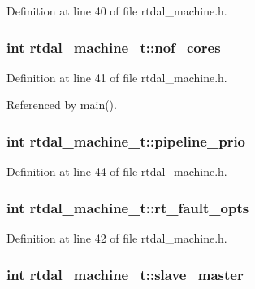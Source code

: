Definition at line 40 of file rtdal\-\_\-machine.\-h.

\hypertarget{structrtdal__machine__t_aac3563adebb6d638b13bc8ec653ee745}{
\subsubsection[{nof\-\_\-cores}]{\setlength{\rightskip}{0pt plus 5cm}int rtdal\-\_\-machine\-\_\-t\-::nof\-\_\-cores}}\label{structrtdal__machine__t_aac3563adebb6d638b13bc8ec653ee745}


Definition at line 41 of file rtdal\-\_\-machine.\-h.



Referenced by main().

\hypertarget{structrtdal__machine__t_a8e553a91b8b34808eb8f20332fdc1189}{
\subsubsection[{pipeline\-\_\-prio}]{\setlength{\rightskip}{0pt plus 5cm}int rtdal\-\_\-machine\-\_\-t\-::pipeline\-\_\-prio}}\label{structrtdal__machine__t_a8e553a91b8b34808eb8f20332fdc1189}


Definition at line 44 of file rtdal\-\_\-machine.\-h.

\hypertarget{structrtdal__machine__t_a9b0cff836cea88c3b44359d928412737}{
\subsubsection[{rt\-\_\-fault\-\_\-opts}]{\setlength{\rightskip}{0pt plus 5cm}int rtdal\-\_\-machine\-\_\-t\-::rt\-\_\-fault\-\_\-opts}}\label{structrtdal__machine__t_a9b0cff836cea88c3b44359d928412737}


Definition at line 42 of file rtdal\-\_\-machine.\-h.

\hypertarget{structrtdal__machine__t_a6933855be619cf21e0b2d4846179795e}{
\subsubsection[{slave\-\_\-master}]{\setlength{\rightskip}{0pt plus 5cm}int rtdal\-\_\-machine\-\_\-t\-::slave\-\_\-master}}\label{structrtdal__machine__t_a6933855be619cf21e0b2d4846179795e}


